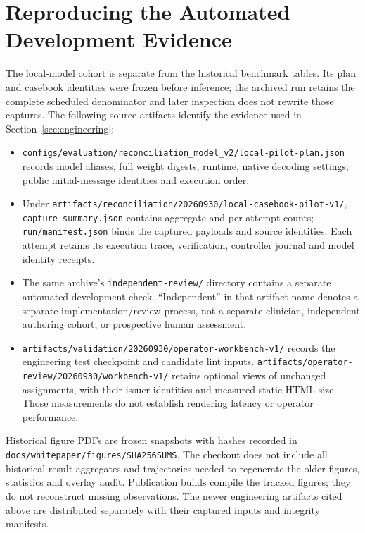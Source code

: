 \section{Reproducing the Automated Development Evidence}
\label{app:engineering-reproduction}

The local-model cohort is separate from the historical benchmark tables.
Its plan and casebook identities were frozen before inference; the archived
run retains the complete scheduled denominator and later inspection does not
rewrite those captures. The following source artifacts identify the evidence
used in Section~\ref{sec:engineering}:
\begin{itemize}
  \item \texttt{configs/evaluation/reconciliation\_model\_v2/local-pilot-plan.json}
  records model aliases, full weight digests, runtime, native decoding settings,
  public initial-message identities and execution order.
  \item Under \texttt{artifacts/reconciliation/20260930/local-casebook-pilot-v1/},
  \texttt{capture-summary.json} contains aggregate and per-attempt counts;
  \texttt{run/manifest.json} binds the captured payloads and source identities.
  Each attempt retains its execution trace, verification, controller journal
  and model identity receipts.
  \item The same archive's \texttt{independent-review/} directory contains a
  separate automated development check. ``Independent'' in that artifact name
  denotes a separate implementation/review process, not a separate clinician,
  independent authoring cohort, or prospective human assessment.
  \item \texttt{artifacts/validation/20260930/operator-workbench-v1/}
  records the engineering test checkpoint and candidate lint inputs.
  \texttt{artifacts/operator-review/20260930/workbench-v1/} retains optional
  views of unchanged assignments, with their issuer identities and measured
  static HTML size. Those measurements do not establish rendering latency or
  operator performance.
\end{itemize}

Historical figure PDFs are frozen snapshots with hashes recorded in
\texttt{docs/whitepaper/figures/SHA256SUMS}. The checkout does not include
all historical result aggregates and trajectories needed to regenerate the
older figures, statistics and overlay audit. Publication builds compile the
tracked figures; they do not reconstruct missing observations. The newer
engineering artifacts cited above are distributed separately with their
captured inputs and integrity manifests.

